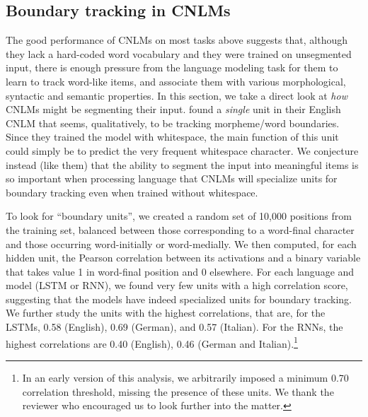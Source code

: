 \subsection{Boundary tracking in CNLMs}
\label{sec:segmentation}


The good performance of CNLMs on most tasks above suggests that,
although they lack a hard-coded word vocabulary and they were trained
on unsegmented input, there is enough pressure from the language
modeling task for them to learn to track word-like items, and
associate them with various morphological, syntactic and semantic
properties. In this section, we take a direct look at \emph{how} CNLMs
might be segmenting their input.
 found a \emph{single} unit in
their English CNLM that seems, qualitatively, to be tracking
morpheme/word boundaries.  Since they trained the model with
whitespace, the main function of this unit could simply be to predict
the very frequent whitespace character. We conjecture instead (like them) that the
ability to segment the input into meaningful items is so important
when processing language that CNLMs will specialize units for boundary
tracking even when trained without whitespace.

To look for ``boundary units'', we created a random set of 10,000
positions from the training set, balanced between those corresponding
to a word-final character and those occurring word-initially or
word-medially.  We then computed, for each hidden unit, the Pearson
correlation between its activations and a binary variable that takes value 1 in
word-final position and 0 elsewhere. %
For each language and model (LSTM or RNN), we found very few units
with a high correlation score, suggesting that the models have indeed
specialized units for boundary tracking. We further study the units
with the highest correlations, that are, for the LSTMs, 0.58
(English), 0.69 (German), and 0.57 (Italian).  For the RNNs, the
highest correlations are 0.40 (English), 0.46 (German and
Italian).\footnote{In an early version of this analysis, we
  arbitrarily imposed a minimum 0.70 correlation threshold, missing
  the presence of these units. We thank the reviewer who encouraged us to
  look further into the matter.}

